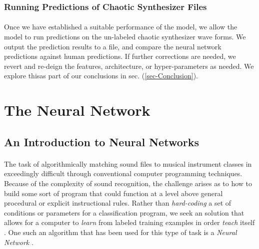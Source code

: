 \documentclass[12pt,letterpaper]{article}
\begin{document}

\subsubsection{Running Predictions of Chaotic Synthesizer Files}

\paragraph*{}Once we have established a suitable performance of the model, we allow the model to run predictions on the un-labeled chaotic synthesizer wave forms. We output the prediction results to a file, and compare the neural network predictions against human predictions. If further corrections are needed, we revert and re-deign the features, architecture, or hyper-parameters as needed. We explore thisas part of our conclusions in sec. (\ref{sec-Conclusion}).


\newpage
\section{The Neural Network}
\label{sec-TheNeuralNetwork}


\subsection{An Introduction to Neural Networks}
\label{subsec-NerualNetworkIntro}

\paragraph*{}The task of algorithmically matching sound files to musical instrument classes in exceedingly difficult through conventional computer programming techniques. Because of the complexity of sound recognition, the challenge arises as to how to build some sort of program that could function at a level above general procedural or explicit instructional rules. Rather than \textit{hard-coding} a set of conditions or parameters for a classification program, we seek an solution that allows for a computer to \textit{learn} from labeled training examples in order \textit{teach} itself \cite{Bishop,Mitchell}. One such an algorithm that has been used for this type of task is a \textit{Neural Network} \cite{Geron2,Goodfellow,Levine}.
\end{document}
